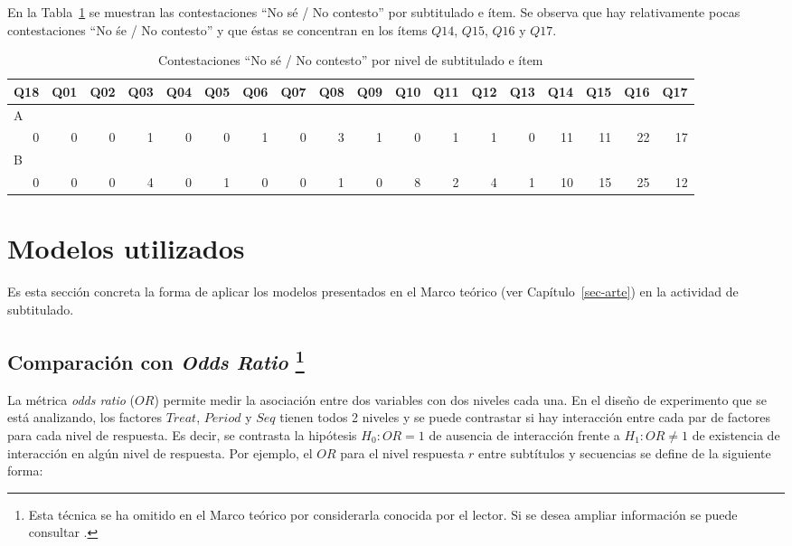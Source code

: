 \documentclass[
  12pt,
  a4paper,
  extrafontsizes,
  onecolumn,
  openright,
  table]{memoir}
\begin{document}
En la Tabla~\ref{tbl-no-response} se muestran las contestaciones
\enquote{No sé / No contesto} por subtitulado e ítem. Se observa que hay
relativamente pocas contestaciones \enquote{No śe / No contesto} y que
éstas se concentran en los ítems \(Q14\), \(Q15\), \(Q16\) y \(Q17\).

\tiny

\hypertarget{tbl-no-response}{}
\begin{longtable}{rrrrrrrrrrrrrrrrrr}
\caption{\label{tbl-no-response}Contestaciones ``No sé / No contesto'' por nivel de subtitulado e ítem }\tabularnewline

\toprule
Q18 & Q01 & Q02 & Q03 & Q04 & Q05 & Q06 & Q07 & Q08 & Q09 & Q10 & Q11 & Q12 & Q13 & Q14 & Q15 & Q16 & Q17 \\ 
\midrule
\multicolumn{18}{l}{A} \\ 
\midrule
0 & 0 & 0 & 1 & 0 & 0 & 1 & 0 & 3 & 1 & 0 & 1 & 1 & 0 & 11 & 11 & 22 & 17 \\ 
\midrule
\multicolumn{18}{l}{B} \\ 
0 & 0 & 0 & 4 & 0 & 1 & 0 & 0 & 1 & 0 & 8 & 2 & 4 & 1 & 10 & 15 & 25 & 12 \\ 
\bottomrule
\end{longtable}

\normalsize

\hypertarget{sec-modelos-utilizados}{%
\section{Modelos utilizados}\label{sec-modelos-utilizados}}

Es esta sección concreta la forma de aplicar los modelos presentados en
el Marco teórico (ver Capítulo~\ref{sec-arte}) en la actividad de
subtitulado.

\hypertarget{sec-or-2}{%
\subsection[Comparación con \emph{Odds Ratio}
]{\texorpdfstring{Comparación con \emph{Odds Ratio}
\footnote{Esta técnica se ha omitido en el Marco teórico por
  considerarla conocida por el lector. Si se desea ampliar información
  se puede consultar \textcite[p.~18]{agresti2010}.}}{Comparación con Odds Ratio }}\label{sec-or-2}}

La métrica \emph{\gls{odds ratio}} (\(OR\)) permite medir la asociación
entre dos variables con dos niveles cada una. En el diseño de
experimento que se está analizando, los factores \(Treat\), \(Period\) y
\(Seq\) tienen todos 2 niveles y se puede contrastar si hay interacción
entre cada par de factores para cada nivel de respuesta. Es decir, se
contrasta la hipótesis \(H_0: OR=1\) de ausencia de interacción frente a
\(H_1: OR \neq 1\) de existencia de interacción en algún nivel de
respuesta. Por ejemplo, el \(OR\) para el nivel respuesta \(r\) entre
subtítulos y secuencias se define de la siguiente forma:
\end{document}
